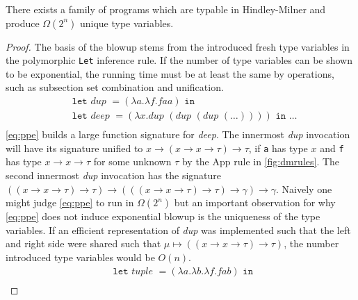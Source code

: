 \documentclass[11pt,oneside,a4paper]{report}
\begin{document}
\begin{lemma}
    There exists a family of programs which are typable in Hindley-Milner and produce $\Omega(2^n)$ unique type variables.
\end{lemma}
\begin{proof}
    The basis of the blowup stems from the introduced fresh type variables in the polymorphic \texttt{Let} inference rule.
    If the number of type variables can be shown to be exponential, the running time must be at least the same by operations, such as subsection set combination and unification.
    \begin{align}
      &\texttt{let } \textit{dup } = (\lambda a .\lambda f . f a a) \texttt{ in } \label{eq:ppe}\\
      &\texttt{let } \textit{deep } = (\lambda x . \textit{dup } (\textit{dup } (\textit{dup } (\dots)))) \texttt{ in } \dots \tag*{}\\
    \end{align}
    \autoref{eq:ppe} builds a large function signature for \textit{deep}.
    The innermost \textit{dup} invocation will have its signature unified to $x \rightarrow (x \rightarrow x \rightarrow \tau) \rightarrow \tau$, if \texttt{a} has type $x$ and \texttt{f} has type $x \rightarrow x \rightarrow \tau$ for some unknown $\tau$ by the App rule in \autoref{fig:dmrules}.
    The second innermost \textit{dup} invocation has the signature $((x \rightarrow x \rightarrow \tau) \rightarrow \tau) \rightarrow (((x \rightarrow x \rightarrow \tau) \rightarrow \tau) \rightarrow \gamma) \rightarrow \gamma$.
    Naively one might judge \autoref{eq:ppe} to run in $\Omega(2^n)$ but an important observation for why \autoref{eq:ppe} does not induce exponential blowup is the uniqueness of the type variables.
    If an efficient representation of \textit{dup} was implemented such that the left and right side were shared such that $\mu \mapsto ((x \rightarrow x \rightarrow \tau) \rightarrow \tau)$, the number introduced type variables would be $O(n)$.
    \begin{align}
      &\texttt{let } \textit{tuple } = (\lambda a . \lambda b . \lambda f . f a b) \texttt{ in } \label{eq:ppexp}\\

\end{align}
\end{proof}
\end{document}
